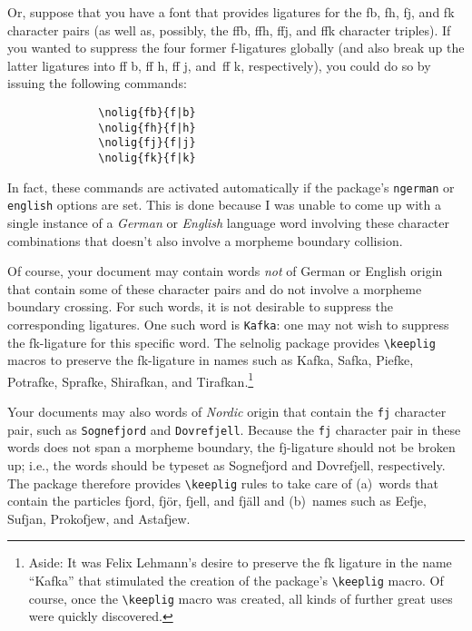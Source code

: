 \documentclass[11pt]{article}
\newcommand{\pkg}[1]{\textsf{#1}}
\newcommand{\opt}[1]{\texttt{#1}}
\newcommand{\cmmd}[1]{\texttt{\textbackslash #1}}
\begin{document}
Or, suppose that you have a font that provides ligatures for the {\ebg \mbox{fb}, \mbox{fh}, \mbox{fj},} and {\ebg\mbox{fk}} character pairs (as well as, possibly, the {\ebg \mbox{ffb}, \mbox{ffh}, \mbox{ffj},} and {\ebg\mbox{ffk}} character triples). If you wanted to suppress the four former f-ligatures globally (and also break up the latter ligatures into ff\kern0pt b, ff\kern0pt h, ff\kern0pt j, and~ff\kern0pt k, respectively), you could do so by issuing the following commands: 
\begin{Verbatim}
              \nolig{fb}{f|b}
              \nolig{fh}{f|h}
              \nolig{fj}{f|j}
              \nolig{fk}{f|k}
\end{Verbatim}
In fact, these commands are activated automatically if the package's \opt{ngerman} or \opt{english} options are set. This is done because I was unable to come up with a single instance of a \emph{German} or \emph{English} language word involving these character combinations that doesn't also involve a morpheme boundary collision.

Of course, your document may contain words \emph{not} of German or English origin that contain some of these character pairs and do not involve a morpheme boundary crossing. For such words, it is not desirable to suppress the corresponding ligatures. One such word is \opt{Kafka}: one may not wish to suppress the {\ebg\mbox{fk}}-ligature for this specific word. The \pkg{selnolig} package provides \cmmd{keeplig} macros to preserve the {\ebg\mbox{fk}}-ligature in names such as {\ebg Kafka, Safka, Piefke, Potrafke, Sprafke, Shirafkan,} and {\ebg Tirafkan}.\footnote{Aside: It was Felix Lehmann's desire to preserve the {\ebg\mbox{fk}} ligature in the name \enquote{{\ebg Kafka}} that stimulated the creation of the package's \cmmd{keeplig} macro. Of course, once the \cmmd{keeplig} macro was created, all kinds of further great uses were quickly discovered.} 

Your documents may also words of \emph{Nordic} origin that contain the \opt{fj} character pair, such as \opt{Sognefjord} and \opt{Dovrefjell}. Because the \opt{fj} character pair in these words does not span a morpheme boundary, the {\ebg\mbox{fj}}-ligature should not be broken up; i.e., the words should be typeset as {\ebg Sognefjord and Dovrefjell}, respectively. The package therefore provides \cmmd{keeplig} rules to take care of (a)~words that contain the particles {\ebg fjord, fjör, fjell, and fjäll} and (b)~names such as {\ebg Eefje, Sufjan, Prokofjew, and Astafjew}.
\end{document}
